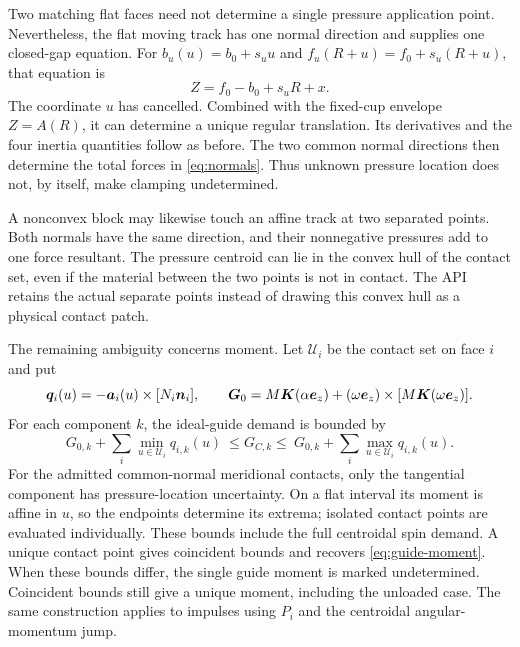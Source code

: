 \documentclass[11pt,letterpaper]{article}
\numberwithin{equation}{section}
\begin{document}
Two matching flat faces need not determine a single pressure application point.
Nevertheless, the flat moving track has one normal direction and supplies one
closed-gap equation. For $b_u(u)=b_0+s_u u$ and
$f_u(R+u)=f_0+s_u(R+u)$, that equation is
\begin{equation}
 Z=f_0-b_0+s_uR+x.
\end{equation}
The coordinate $u$ has cancelled. Combined with the fixed-cup envelope
$Z=A(R)$, it can determine a unique regular translation. Its derivatives and
the four inertia quantities follow as before. The two common normal directions
then determine the total forces in \cref{eq:normals}. Thus unknown pressure
location does not, by itself, make clamping undetermined.

A nonconvex block may likewise touch an affine track at two separated points.
Both normals have the same direction, and their nonnegative pressures add to
one force resultant. The pressure centroid can lie in the convex hull of the
contact set, even if the material between the two points is not in contact.
The API retains the actual separate points instead of drawing this convex
hull as a physical contact patch.

The remaining ambiguity concerns moment. Let $\mathcal U_i$ be the contact set
on face $i$ and put
\begin{equation}
 \bm q_i(u)=-\bm a_i(u)\times[N_i\bm n_i],\qquad
 \bm G_0=M\bm K(\alpha\bm e_z)
   +(\omega\bm e_z)\times[M\bm K(\omega\bm e_z)].
\end{equation}
For each component $k$, the ideal-guide demand is bounded by
\begin{equation}
 G_{0,k}+\sum_i\min_{u\in\mathcal U_i}q_{i,k}(u)
 \ \leq G_{C,k}\leq\
 G_{0,k}+\sum_i\max_{u\in\mathcal U_i}q_{i,k}(u).
 \label{eq:guide-bounds}
\end{equation}
For the admitted common-normal meridional contacts, only the tangential
component has pressure-location uncertainty. On a flat interval its moment
is affine in $u$, so the endpoints determine its extrema; isolated contact
points are evaluated individually. These bounds include the full centroidal
spin demand. A unique contact point gives coincident bounds and recovers
\cref{eq:guide-moment}. When these bounds differ, the single guide moment is marked undetermined.
Coincident bounds still give a unique moment, including the unloaded case. The same construction applies to
impulses using $P_i$ and the centroidal angular-momentum jump.
\end{document}
